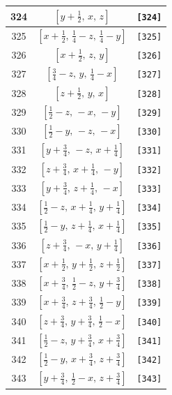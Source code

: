 \documentclass[fleqn,8pt]{jsarticle}
\begin{document}
\begin{longtable}{ccc}
324 & $\left[ y + \frac{1}{2},\, x,\, z \right]$ & {\tt [324]} \\ \hline
325 & $\left[ x + \frac{1}{2},\, \frac{1}{4} - z,\, \frac{1}{4} - y \right]$ & {\tt [325]} \\ \hline
326 & $\left[ x + \frac{1}{2},\, z,\, y \right]$ & {\tt [326]} \\ \hline
327 & $\left[ \frac{3}{4} - z,\, y,\, \frac{1}{4} - x \right]$ & {\tt [327]} \\ \hline
328 & $\left[ z + \frac{1}{2},\, y,\, x \right]$ & {\tt [328]} \\ \hline
329 & $\left[ \frac{1}{2} - z,\, - x,\, - y \right]$ & {\tt [329]} \\ \hline
330 & $\left[ \frac{1}{2} - y,\, - z,\, - x \right]$ & {\tt [330]} \\ \hline
331 & $\left[ y + \frac{3}{4},\, - z,\, x + \frac{1}{4} \right]$ & {\tt [331]} \\ \hline
332 & $\left[ z + \frac{3}{4},\, x + \frac{1}{4},\, - y \right]$ & {\tt [332]} \\ \hline
333 & $\left[ y + \frac{3}{4},\, z + \frac{1}{4},\, - x \right]$ & {\tt [333]} \\ \hline
334 & $\left[ \frac{1}{2} - z,\, x + \frac{1}{4},\, y + \frac{1}{4} \right]$ & {\tt [334]} \\ \hline
335 & $\left[ \frac{1}{2} - y,\, z + \frac{1}{4},\, x + \frac{1}{4} \right]$ & {\tt [335]} \\ \hline
336 & $\left[ z + \frac{3}{4},\, - x,\, y + \frac{1}{4} \right]$ & {\tt [336]} \\ \hline
337 & $\left[ x + \frac{1}{2},\, y + \frac{1}{2},\, z + \frac{1}{2} \right]$ & {\tt [337]} \\ \hline
338 & $\left[ x + \frac{3}{4},\, \frac{1}{2} - z,\, y + \frac{3}{4} \right]$ & {\tt [338]} \\ \hline
339 & $\left[ x + \frac{3}{4},\, z + \frac{3}{4},\, \frac{1}{2} - y \right]$ & {\tt [339]} \\ \hline
340 & $\left[ z + \frac{3}{4},\, y + \frac{3}{4},\, \frac{1}{2} - x \right]$ & {\tt [340]} \\ \hline
341 & $\left[ \frac{1}{2} - z,\, y + \frac{3}{4},\, x + \frac{3}{4} \right]$ & {\tt [341]} \\ \hline
342 & $\left[ \frac{1}{2} - y,\, x + \frac{3}{4},\, z + \frac{3}{4} \right]$ & {\tt [342]} \\ \hline
343 & $\left[ y + \frac{3}{4},\, \frac{1}{2} - x,\, z + \frac{3}{4} \right]$ & {\tt [343]} \\ \hline

\end{longtable}
\end{document}
